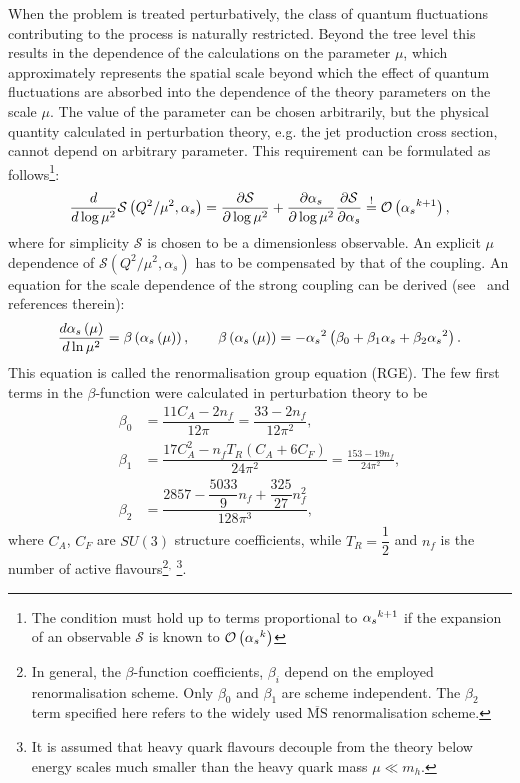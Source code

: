 When the problem is treated perturbatively, the class of quantum fluctuations contributing to the process is naturally restricted. Beyond the tree level this results in the dependence of the calculations on the parameter $\mu$, which approximately represents the spatial scale beyond which the effect of quantum fluctuations are absorbed into the dependence of the theory parameters on the scale $\mu$. The value of the parameter can be chosen arbitrarily, but the physical quantity calculated in perturbation theory, e.g. the jet production cross section, cannot depend on arbitrary parameter. This requirement can be formulated as follows\footnote{The condition must hold up to terms proportional to $\mbox{$\alpha_{s}$}^{k+1}$ if the expansion of an observable $\mathcal{S}$ is known to $\mathcal{O}\left(\mbox{$\alpha_{s}$}^{k}\right)$}:
\begin{equation}
 \frac{d}{d\log{\mu^2}} \mathcal{S} \left( Q^2/\mu^2, \alpha_s \right) = \frac{\partial \mathcal{S} }{\partial \log{\mu^2}} + \frac{\partial \alpha_s }{\partial \log{\mu^2}}\frac{\partial \mathcal{S} }{\partial \alpha_s} \stackrel{!}{=} \mathcal{O}\left(\mbox{$\alpha_{s}$}^{k+1}\right),
\end{equation}
where for simplicity $\mathcal{S}$ is chosen to be a dimensionless observable. An explicit $\mu$ dependence of $\mathcal{S} \left( Q^2/\mu^2, \alpha_s \right)$ has to be compensated by that of the coupling. An equation for the scale dependence of the strong coupling can be derived (see~\cite{pdg} and references therein):
 \begin{equation}
   \frac{d\mbox{$\alpha_{s}$}\left(\mu\right)}{d\ln{\mu^2}} = \beta\left(\mbox{$\alpha_{s}$}\left(\mu\right)\right),\qquad \beta\left(\mbox{$\alpha_{s}$}\left(\mu\right)\right) = -\mbox{$\alpha_{s}$}^2\left(\beta_0 + \beta_1\mbox{$\alpha_{s}$} + \beta_2\mbox{$\alpha_{s}$}^2\right).
 \label{eq:asrunnig}
 \end{equation}
This equation is called the renormalisation group equation (RGE). The few first terms in the $\beta$-function were calculated in perturbation theory to be
\begin{align}
	\beta_0 &= \dfrac{11C_A-2n_f}{12\pi} = \dfrac{33 - 2n_f}{12\pi^2},\\
	\beta_1 &= \dfrac{17C_A^2-n_fT_R\left(C_A+6C_F\right)}{24\pi^2} = \frac{153-19n_f}{24\pi^2},\\
	\beta_2 &= \dfrac{2857-\dfrac{5033}{9}n_f+\dfrac{325}{27}n_f^2}{128\pi^3},
\end{align}
where $C_A$, $C_F$ are $SU\left(3\right)$ structure coefficients, while $T_R=\dfrac{1}{2}$ and $n_f$ is the number of active flavours\footnote{In general, the $\beta$-function coefficients, $\beta_i$ depend on the employed renormalisation scheme. Only $\beta_0$ and $\beta_1$ are scheme independent. The $\beta_2$ term specified here refers to the widely used $\overline{\mathrm{MS}}$ renormalisation scheme.}$^,$
\footnote{It is assumed that heavy quark flavours decouple from the theory below energy scales much smaller than the heavy quark mass $\mu \ll m_h$.}. 

